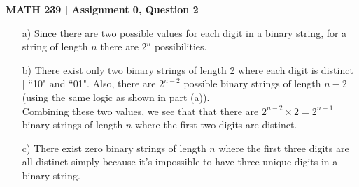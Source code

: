 \documentclass{report}
\begin{document}
\textbf{MATH 239 | Assignment 0, Question 2}
\begin{enumerate}
\item[a)] Since there are two possible values for each digit in a binary string, for a string of length $n$ there are $2^n$ possibilities.

\item[b)] There exist only two binary strings of length 2 where each digit is distinct | ``10" and ``01". Also, there are $2^{n-2}$ possible binary strings of length $n-2$ (using the same logic as shown in part (a)).\\
Combining these two values, we see that that there are $2^{n-2} \times 2 = 2^{n-1}$ binary strings of length $n$ where the first two digits are distinct.

\item[c)] There exist zero binary strings of length $n$ where the first three digits are all distinct simply because it's impossible to have three unique digits in a binary string.
\end{enumerate}
\end{document}
